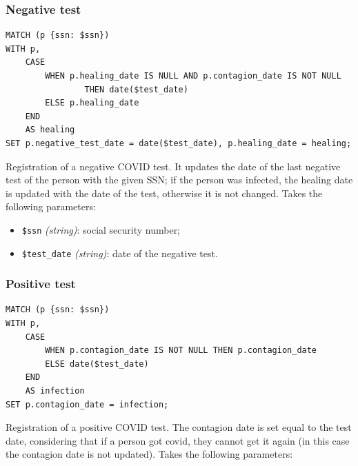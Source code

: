 \documentclass[12pt, a4paper]{article}
\begin{document}
\subsubsection{Negative test}

\begin{tcolorbox}[fontupper=\scriptsize]
    \begin{verbatim}
MATCH (p {ssn: $ssn})
WITH p,
    CASE 
        WHEN p.healing_date IS NULL AND p.contagion_date IS NOT NULL 
                THEN date($test_date)
        ELSE p.healing_date
    END 
    AS healing
SET p.negative_test_date = date($test_date), p.healing_date = healing;

    \end{verbatim}
\end{tcolorbox}

\noindent %
Registration of a negative COVID test. It updates the date of the last negative
test of the person with the given SSN; if the person was infected, the healing 
date is updated with the date of the test, otherwise it is not changed.
Takes the following parameters: 

\begin{itemize}
    \item \texttt{\$ssn} \emph{(string)}: social security number;
    \item \texttt{\$test\_date} \emph{(string)}: date of the negative test.
\end{itemize}

\subsubsection{Positive test}

\begin{tcolorbox}[fontupper=\scriptsize]
    \begin{verbatim}
MATCH (p {ssn: $ssn})
WITH p,
    CASE 
        WHEN p.contagion_date IS NOT NULL THEN p.contagion_date
        ELSE date($test_date)
    END 
    AS infection
SET p.contagion_date = infection;
    \end{verbatim}
\end{tcolorbox}

\noindent %
Registration of a positive COVID test. The contagion date is set equal to the 
test date, considering that if a person got covid, they cannot get it again 
(in this case the contagion date is not updated).
Takes the following parameters: 
\end{document}
